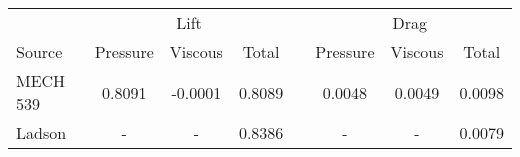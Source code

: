 
    \begin{tabular}{@{} l ccc c ccc}
    \toprule
     & \multicolumn{3}{c}{Lift} & \phantom{a} & \multicolumn{3}{c}{Drag}\\
    \cmidrule{2-4}\cmidrule{6-8}
    Source & Pressure & Viscous & Total && Pressure & Viscous & Total\\
    \midrule
    MECH 539 & 0.8091 & -0.0001 & 0.8089 && 0.0048 & 0.0049 & 0.0098\\
    Ladson & - & - & 0.8386 && - & - & 0.0079\\
    \bottomrule
    \end{tabular}
    